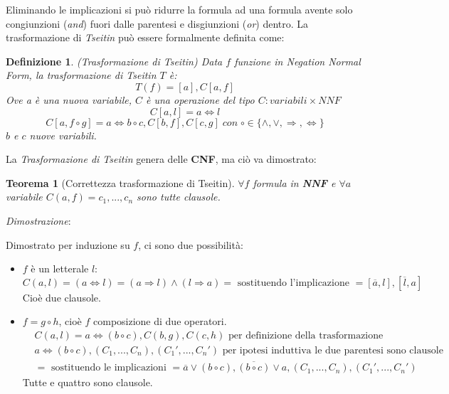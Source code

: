 \documentclass[a4paper]{article}
\newtheorem*{theorem}{Teorema}
\newtheorem*{definition}{Definizione}
\newenvironment{dimostrazione}{\textit{Dimostrazione}:\begin{adjustwidth}{1cm}{}}{\end{adjustwidth}}
\begin{document}
Eliminando le implicazioni si può ridurre la formula ad una formula avente solo congiunzioni (\textit{and}) fuori dalle parentesi e disgiunzioni (\textit{or}) dentro.
La trasformazione di \textit{Tseitin} può essere formalmente definita come:
\begin{definition}(Trasformazione di Tseitin)
 	Data $f$ funzione in Negation Normal Form, la trasformazione di Tseitin $T$ è:
	$$ T(f) = [a],C[a,f]$$
	Ove a è una nuova variabile, $C$ è una operazione del tipo $C: variabili \times NNF$
	$$C[a,l] = a \Leftrightarrow l$$
	$$C[a,f \circ g] = a \Leftrightarrow b \circ c, C[b,f],C[c,g]\; con \; \circ \in \{\land,\lor, \Rightarrow, \Leftrightarrow\}$$
	$b$ e $c$ nuove variabili.
\end{definition}
La \textit{Trasformazione di Tseitin} genera delle \textbf{CNF}, ma ciò va dimostrato:
\begin{theorem}[Correttezza trasformazione di Tseitin]
	$\forall f $ formula in \textbf{NNF} e $\forall a$ variabile $C(a,f) = c_1,...,c_n$ sono tutte clausole.
\end{theorem}
\begin{dimostrazione}
	Dimostrato per induzione su $f$, ci sono due possibilità:
	\begin{itemize}
		\item $f$ è un letterale $l$:
			\begin{equation*}
			C(a,l) = (a \Leftrightarrow l) = (a \Rightarrow l) \land (l \Rightarrow a)= 
			\text{ sostituendo l'implicazione } = [ \overline a, l],[ \overline l, a]
			\end{equation*}
			Cioè due clausole.
		\item $f = g \circ h$, cioè $f$ composizione di due operatori.
			\begin{align*}
				&C(a,l) = a \Leftrightarrow (b \circ c),C(b,g), C(c,h) \text{ per definizione della trasformazione} \\
				&a \Leftrightarrow (b \circ c), (C_1,...,C_n), (C_1',..., C_n') \text{ per ipotesi induttiva le due parentesi sono clausole}\\
				&= \text{ sostituendo le implicazioni } = \overline a \lor  (b \circ c), \overline{(b \circ c)} \lor a, (C_1,...,C_n), (C_1',..., C_n')
                        \end{align*}
			Tutte e quattro sono clausole.
	\end{itemize}
\end{dimostrazione}
\end{document}
